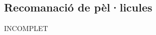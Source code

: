 \subsection{Recomanació de pèl·licules}
INCOMPLET
\begin{comment}
Existeixen moltes webs que es dediquen a la recomanació de llibres. Es sap que hi ha diferents mètriques per a determinar els tipus de llibres. En aquesta primera part analitzarem l'ús de les diferents metriques per a fer aquestes recomanacions.

El primer (i més gran) grup de webs són les que recomanen llibres basant-se en l'assumpció de que, si a un grup d'usuaris li agraden dos llibres i a tu t'agrada un d'aquests dos llibres, l'altré també t'agradarà\cite{Amazon,EntreLectores,Librofilia,Shelfari,Goodreads,Librarything}.

Aquesta primera explicació, tot i que simplista, deixa clara l'idea darrera d'aquestes webs, que és la suposició de que t'agradaran les coses que agraden a usuaris amb gustos similars. Aquests gustos similars, a diferencia de l'exemple, però, poden ser analitzats de múltiples formes, tot i que l'objectiu final sempre serà el mateix: Establir una similitut entre dos usuàris, i buscar llibres que hagin agradat a usuaris similars a l'usuari al que es busca fer la recomanació.

Hi ha un altre conjunt de webs que, enlloc de, com les anteriors, basar-se en un conjunt molt gran de lectures, el que fan es recomanar llibres a l'usuari tenint en compte únicament l'últim llibre llegit\cite{Bookseer,Whatshouldireadnext}. Això té una gran ventatge a nivell d'experiencia d'usuari que és que s'evita el necesitar un coneixement dels gustos de l'usuari. Aquest tipus d'aprenentatge en el que es basa és en el coneixement de característiques del llibre, i aleshores busca llibres que, per a aquestes caracteristiques conegudes, siguin similars.

Parlant més concretament de Book Seer\cite{Bookseer}, les característiques que fa servir són precisament les dades de dues webs comentades anteriorment, Amazon\cite{Amazon} i LibraryThing\cite{Librarything}. Fa servir les dades d'aquestes webs per a evitar a l'usuari tenir que registrar-se i crear la seva biblioteca, i en canvi recomana basant-se en un conjunt d'informació més petit, com es l'últim llibre\cite{Bookseer-usa-amazon}.

Hi ha un projecte interesant, Booklamp\cite{Booklamp}, que, enlloc de basar-se en dades d'usuari o característiques com les que podrien ser tags, genere del llibre, autor, etc., el que fà és analitzar tot el contingut del llibre. D'aquest contingut n'extreu unes métriques, que seràn les que farà servir per a determinar si el llibre pot agradar o no a l'usuari. De forma teòrica, aquest sistema hauria de tenir una tasa d'encert molt alta, però la gran dificultat que té es obtenir unes bones caracteristiques donat únicament el contingut en pla del llibre.

Com es pot veure, hi ha molts projectes que tracten el tema de la recomanació de llibres.
\end{comment}
